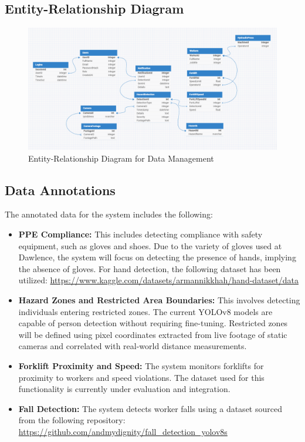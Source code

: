 \documentclass[12pt]{article}
\begin{document}
\subsection{Entity-Relationship Diagram}
\begin{figure}[H] %
    \centering
    \includegraphics[width=\textwidth]{ERD.png}
    \caption{Entity-Relationship Diagram for Data Management}
    \label{fig:er_diagram}
\end{figure}

\subsection{Data Annotations}
The annotated data for the system includes the following:

\begin{itemize}
    \item \textbf{PPE Compliance:}  
    This includes detecting compliance with safety equipment, such as gloves and shoes. Due to the variety of gloves used at Dawlence, the system will focus on detecting the presence of hands, implying the absence of gloves. For hand detection, the following dataset has been utilized:  
    \url{https://www.kaggle.com/datasets/armannikkhah/hand-dataset/data}
    
    \item \textbf{Hazard Zones and Restricted Area Boundaries:}  
    This involves detecting individuals entering restricted zones. The current YOLOv8 models are capable of person detection without requiring fine-tuning. Restricted zones will be defined using pixel coordinates extracted from live footage of static cameras and correlated with real-world distance measurements.
    
    \item \textbf{Forklift Proximity and Speed:}  
    The system monitors forklifts for proximity to workers and speed violations. The dataset used for this functionality is currently under evaluation and integration.
    
    \item \textbf{Fall Detection:}  
    The system detects worker falls using a dataset sourced from the following repository:  
    \url{https://github.com/andmydignity/fall_detection_yolov8s}
\end{itemize}
\end{document}
